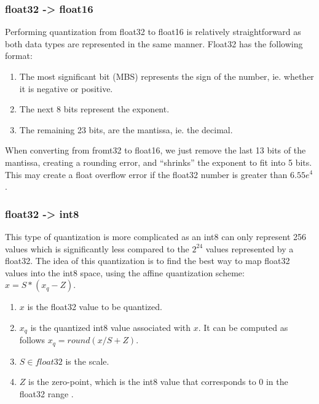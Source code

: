 \documentclass[licencjacka,en]{pracamgr}
\begin{document}
\subsubsection{float32 -> float16}
Performing quantization from float32 to float16 is relatively straightforward as both data types are represented in the same manner. Float32 has the following format: 
\begin{enumerate}
	\item The most significant bit (MBS) represents the sign of the number, ie. whether it is negative or positive.
	\item The next 8 bits represent the exponent.
	\item The remaining 23 bits, are the mantissa, ie. the decimal.
\end{enumerate}

When converting from fromt32 to float16, we just remove the last 13 bits of the mantissa, creating a rounding error, and “shrinks” the exponent to fit into 5 bits. This may create a float overflow error if the float32 number is greater than $ 6.55e^4$ \cite{quant_explained}. 


\subsubsection{float32 -> int8}
This type of quantization is more complicated as an int8 can only represent 256 values which is significantly less compared to the $ 2^24 $  values represented by a float32. The idea of this quantization is to find the best way to map float32 values into the int8 space, using the affine quantization scheme: $ x = S * (x_q - Z) $. 
\begin{enumerate}
	\item $ x $ is the float32 value to be quantized.
	\item  $ x_q $ is the quantized int8 value associated with $ x $. It can be computed as follows $ x_q = round(x/S + Z) $.	
	\item $ S \in float32$ is the scale.
	\item $ Z $ is the zero-point, which is the int8 value that corresponds to 0 in the float32 range \cite{quant_hf}.
\end{enumerate}
\end{document}

